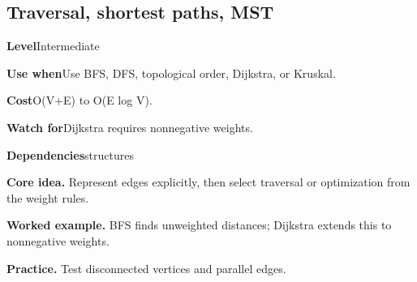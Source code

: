 \documentclass[10pt,letterpaper]{article}
\newcommand{\entrylabel}[1]{\textcolor{accent}{\bfseries #1}}
\begin{document}
\subsection{Traversal, shortest paths, MST}
\begin{guidebox}\small
\entrylabel{Level}\quad Intermediate\par
\entrylabel{Use when}\quad Use BFS, DFS, topological order, Dijkstra, or Kruskal.\par
\entrylabel{Cost}\quad O(V+E) to O(E log V).\par
\entrylabel{Watch for}\quad Dijkstra requires nonnegative weights.\par
\entrylabel{Dependencies}\quad structures\par
\end{guidebox}
\noindent\textbf{Core idea.} Represent edges explicitly, then select traversal or optimization from the weight rules.\par
\noindent\textbf{Worked example.} BFS finds unweighted distances; Dijkstra extends this to nonnegative weights.\par
\noindent\textbf{Practice.} Test disconnected vertices and parallel edges.\par
\end{document}
